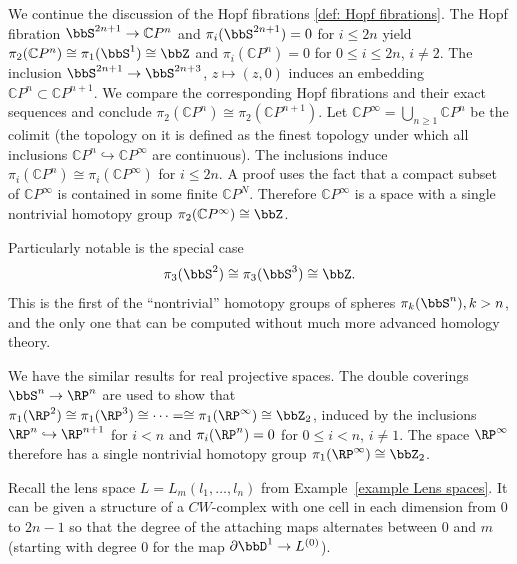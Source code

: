 \begin{example}\label{example Hopf pi3(S2)}
    We continue the discussion of the Hopf fibrations \ref{def: Hopf fibrations}. The Hopf fibration $\bbS^{2n+1}\to \mathbb{C}P^n$ and $\pi_i(\bbS^{2n+1})=0$ for $i\leq 2n$ yield $\pi_2(\mathbb{C}P^n)\cong \pi_1(\bbS^1)\cong \bbZ$ and $\pi_i(\mathbb{C}P^n)=0$ for $0\leq i \leq 2n$, $i\neq 2$. The inclusion $\bbS^{2n+1}\to \bbS^{2n+3}$, $z\mapsto (z,0)$ induces an embedding $\mathbb{C}P^n\subset \mathbb{C}P^{n+1}$. We compare the corresponding Hopf fibrations and their exact sequences and conclude $\pi_2(\mathbb{C}P^n)\cong \pi_2(\mathbb{C}P^{n+1})$. Let $\mathbb{C}P^\infty =\bigcup_{n\geq 1}\mathbb{C}P^n$ be the colimit (the topology on it is defined as the finest topology under which all inclusions $\mathbb{C}P^n\hookrightarrow \mathbb{C}P^\infty$ are continuous). The inclusions induce $\pi_i(\mathbb{C}P^n)\cong\pi_i(\mathbb{C}P^\infty)$ for $i\leq 2n$. A proof uses the fact that a compact subset of $\mathbb{C}P^\infty$ is contained in some finite $\mathbb{C}P^N$. Therefore $\mathbb{C}P^\infty$ is a space with a single nontrivial homotopy group $\pi_2(\mathbb{C}P^\infty)\cong\bbZ$.

    Particularly notable is the special case 
    \[\pi_3(\bbS^2)\cong \pi_3(\bbS^3)\cong\bbZ.\]
    This is the first of the ``nontrivial'' homotopy groups of spheres $\pi_k(\bbS^n), k>n$, and the only one that can be computed without much more advanced homology theory.

    We have the similar results for real projective spaces. The double coverings $\bbS^n\to \RP^n$ are used to show that $\pi_1(\RP^2)\cong \pi_1(\RP^3)\cong\cdots =\cong \pi_1(\RP^\infty)\cong \bbZ_2$, induced by the inclusions $\RP^n\hookrightarrow\RP^{n+1}$ for $i<n$ and $\pi_i(\RP^n)=0$ for $0\leq i< n$, $i\neq 1$. The space $\RP^\infty$ therefore has a single nontrivial homotopy group $\pi_1(\RP^\infty)\cong\bbZ_2$.
\end{example}


\begin{example}
    Recall the lens space $L=L_m(l_1,\ldots,l_n)$ from Example~\ref{example Lens spaces}. It can be given a structure of a $CW$-complex with one cell in each dimension from $0$ to $2n-1$ so that the degree of the attaching maps alternates between $0$ and $m$ (starting with degree $0$ for the map $\partial \bbD^1\to L^{(0)}$).
\end{example}


